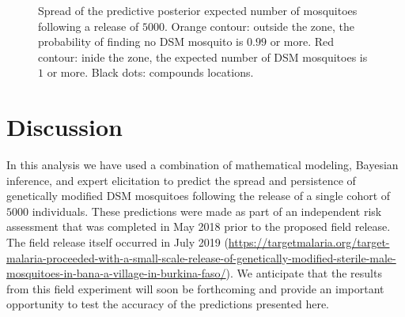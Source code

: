 \documentclass[]{bmcart}
\begin{document}
\begin{figure}[t]
\caption[Spread of the expected number of mosquitoes following a release of $5000$. Orange contour: outside the zone, the probablity of finding no DSM mosquito is $0.99$ or more. Red contour: inide the range, the expected number of DSM mosquito is $1$ or more.]{Spread of the predictive posterior expected number of mosquitoes following a release of $5000$. Orange contour: outside the zone, the probability of finding no DSM mosquito is $0.99$ or more. Red contour: inide the zone, the expected number of DSM mosquitoes is $1$ or more. Black dots: compounds locations.}\label{fig:plotSpread}
\end{figure}

\section{Discussion}
In this analysis we have used a combination of mathematical modeling, Bayesian inference, and expert elicitation to predict the spread and persistence of genetically modified DSM mosquitoes following the release of a single cohort of $5000$ individuals. These predictions were made as part of an independent risk assessment that was completed in May 2018 prior to the proposed field release. The field release itself occurred in July 2019 (\url{https://targetmalaria.org/target-malaria-proceeded-with-a-small-scale-release-of-genetically-modified-sterile-male-mosquitoes-in-bana-a-village-in-burkina-faso/}). We anticipate that the results from this field experiment will soon be forthcoming and provide an important opportunity to test the accuracy of the predictions presented here.
\end{document}
